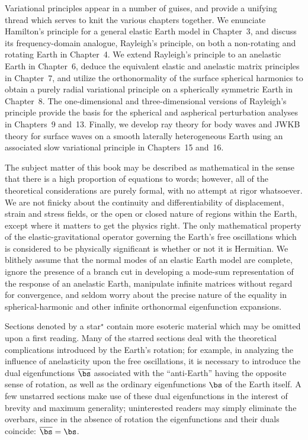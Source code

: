 Variational principles appear in a number of guises, and provide
a unifying thread which serves to knit the various chapters together. 
We enunciate Hamilton's principle for a general elastic Earth
model in Chapter~3, and discuss its frequency-domain analogue,
Rayleigh's principle, on both a non-rotating and rotating
Earth in Chapter~4.  We extend Rayleigh's principle to an
anelastic Earth in Chapter~6, deduce the equivalent
elastic and anelastic matrix
principles in Chapter~7, and utilize the orthonormality of the
surface spherical harmonics to obtain a purely radial variational
principle on a spherically symmetric Earth in Chapter~8.
The one-dimensional and three-dimensional versions
of Rayleigh's principle provide the basis for the
spherical and aspherical perturbation
analyses in Chapters~9 and~13.  Finally, we develop ray theory
for body waves and JWKB theory for surface waves on a smooth
laterally heterogeneous Earth using an associated slow variational
principle in Chapters~15 and~16.

The subject matter of this book may be described as mathematical
in the sense that there is a high proportion of equations to words;
however, all of the theoretical considerations are purely formal,
with no attempt at rigor whatsoever.  We are not finicky about
the continuity and differentiability of displacement, strain and
stress fields, or the open or closed nature of regions within
the Earth, except where it matters to get the physics right.
The only mathematical property of the elastic-gravitational
operator governing the Earth's free oscillations which is
considered to be physically significant is whether or not
it is Hermitian.  We blithely assume that the normal modes
of an elastic Earth model are complete, ignore the presence
of a branch cut in developing a mode-sum representation of
the response of an anelastic Earth, manipulate infinite
matrices without regard for convergence, and seldom worry
about the precise nature of the equality in spherical-harmonic
and other infinite orthonormal eigenfunction expansions.

Sections denoted by a star${}^{\textstyle{\star}}$
contain more esoteric material which may be omitted upon a first
reading.  Many of the starred sections deal with the theoretical
complications introduced by the Earth's rotation; for example,
in analyzing the influence of anelasticity upon the free
oscillations, it is necessary to introduce the
dual eigenfunctions $\overline{\bs}$
associated with the ``anti-Earth'' having the opposite sense
of rotation, as well as the ordinary eigenfunctions $\bs$
of the Earth itself.  A few unstarred sections make use of these
dual eigenfunctions in the interest of brevity and maximum generality;
uninterested readers may simply eliminate the overbars, since in the
absence of rotation the eigenfunctions and their duals
coincide: $\overline{\bs}=\bs$.

